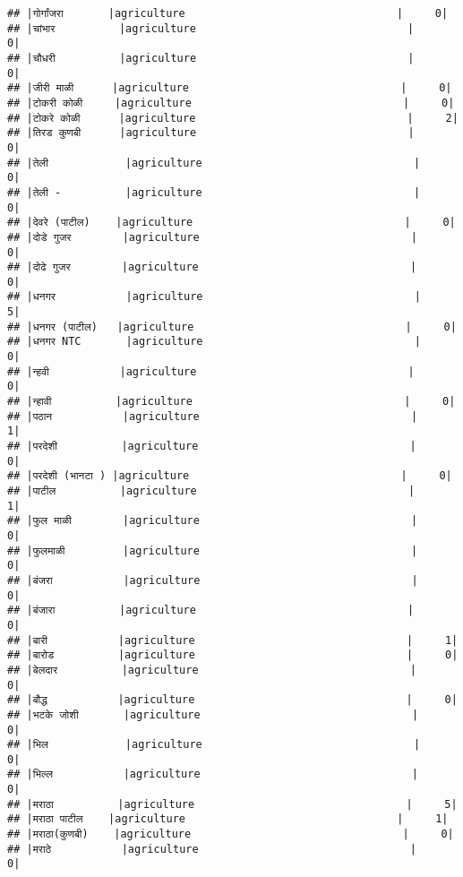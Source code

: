 \documentclass[
]{article}
\begin{document}
\begin{verbatim}
## |गोर्गांजरा       |agriculture                                 |     0|
## |चांभार          |agriculture                                 |     0|
## |चौधरी          |agriculture                                 |     0|
## |जीरी माळी      |agriculture                                 |     0|
## |टोकरी कोळी     |agriculture                                 |     0|
## |टोकरे कोळी      |agriculture                                 |     2|
## |तिरड कुणबी      |agriculture                                 |     0|
## |तेली            |agriculture                                 |     0|
## |तेली -          |agriculture                                 |     0|
## |देवरे (पाटील)    |agriculture                                 |     0|
## |दोडे गुजर        |agriculture                                 |     0|
## |दोढे गुजर        |agriculture                                 |     0|
## |धनगर           |agriculture                                 |     5|
## |धनगर (पाटील)   |agriculture                                 |     0|
## |धनगर NTC       |agriculture                                 |     0|
## |न्हवी           |agriculture                                 |     0|
## |न्हावी          |agriculture                                 |     0|
## |पठान           |agriculture                                 |     1|
## |परदेशी          |agriculture                                 |     0|
## |परदेशी (भानटा ) |agriculture                                 |     0|
## |पाटील          |agriculture                                 |     1|
## |फुल माळी        |agriculture                                 |     0|
## |फुलमाळी         |agriculture                                 |     0|
## |बंजरा           |agriculture                                 |     0|
## |बंजारा          |agriculture                                 |     0|
## |बारी           |agriculture                                 |     1|
## |बारोड          |agriculture                                 |     0|
## |बेलदार          |agriculture                                 |     0|
## |बौद्ध           |agriculture                                 |     0|
## |भटके जोशी       |agriculture                                 |     0|
## |भिल            |agriculture                                 |     0|
## |भिल्ल           |agriculture                                 |     0|
## |मराठा          |agriculture                                 |     5|
## |मराठा पाटील    |agriculture                                 |     1|
## |मराठा(कुणबी)    |agriculture                                 |     0|
## |मराठे           |agriculture                                 |     0|

\end{verbatim}
\end{document}
